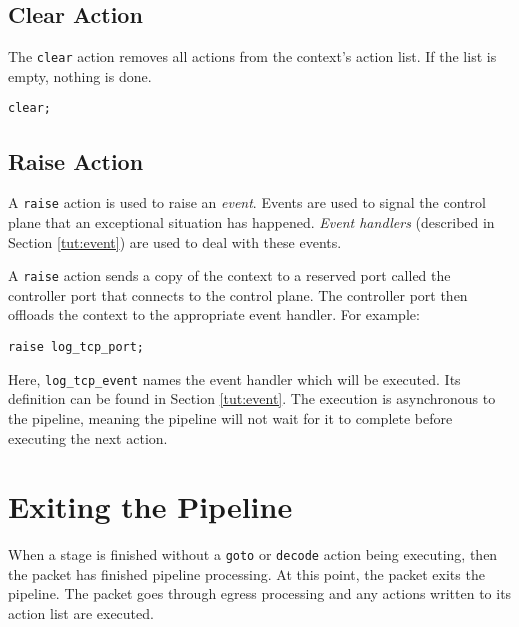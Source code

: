 \subsection{Clear Action} \label{tut:clear_action}

The \texttt{clear} action removes all actions from the context's action list. If the list is empty, nothing is done.

\begin{codepage}
\begin{lstlisting}
clear;
\end{lstlisting}
\end{codepage}

\subsection{Raise Action} \label{tut:raise_action}

A \texttt{raise} action is used to raise an \textit{event}. Events are used to
signal the control plane that an exceptional situation has happened.
\textit{Event handlers} (described in Section \ref{tut:event}) are used to
deal with these events.

A \texttt{raise} action sends a copy of the context to a reserved port called the controller port that connects to the control plane.
The controller port then offloads the context to the appropriate event handler.
For example:

\begin{codepage}
\begin{lstlisting}
raise log_tcp_port;
\end{lstlisting}
\end{codepage}


Here, \texttt{log\_tcp\_event} names the event handler which will be executed. Its definition can be found in Section \ref{tut:event}. The execution is asynchronous to the pipeline, meaning the pipeline will not wait for it to complete before executing the next action.

\section{Exiting the Pipeline} \label{tut:pipeline_exit}

When a stage is finished without a \texttt{goto} or \texttt{decode}
action being executing, then the packet has finished pipeline
processing.
At this point, the packet exits the pipeline.
The packet goes through egress processing and any actions written to its action list are executed.

